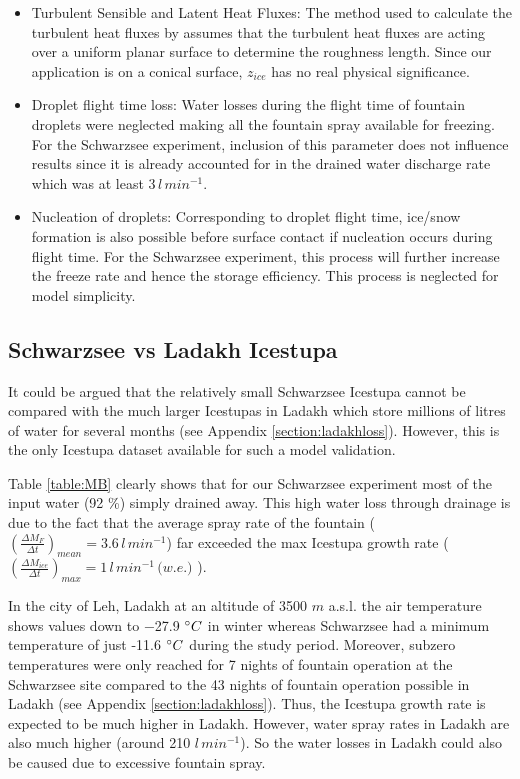 \documentclass[utf8]{frontiersSCNS} %
\begin{document}
\begin{itemize}

\item  Turbulent Sensible and Latent Heat Fluxes: The method used to calculate the turbulent heat fluxes by
  \cite{Garratt_1992} assumes that the turbulent heat fluxes are acting over a uniform planar surface to determine the
  roughness length. Since our application is on a conical surface, $z_{ice}$ has no real physical significance.

\item Droplet flight time loss: Water losses during the flight time of fountain droplets were neglected making all the
  fountain spray available for freezing. For the Schwarzsee experiment, inclusion of this parameter does not influence
  results since it is already accounted for in the drained water discharge rate which was at least $3\, l\,min^{-1}$.

\item Nucleation of droplets: Corresponding to droplet flight time, ice/snow formation is also possible before surface
  contact if nucleation occurs during flight time. For the Schwarzsee experiment, this process will further increase
  the freeze rate and hence the storage efficiency. This process is neglected for model simplicity.

\end{itemize}

\subsection{Schwarzsee vs Ladakh Icestupa}
  
It could be argued that the relatively small Schwarzsee Icestupa cannot be compared with the much larger Icestupas in
Ladakh which store millions of litres of water for several months (see Appendix \ref{section:ladakhloss}). However,
this is the only Icestupa dataset available for such a model validation.

Table \ref{table:MB} clearly shows that for our Schwarzsee experiment most of the input water (92 \%) simply drained
away. This high water loss through drainage is due to the fact that the average spray rate of the fountain
($(\frac{\Delta M_{F}}{\Delta t})_{mean} = 3.6\, l\,min^{-1}$) far exceeded the max Icestupa growth rate
($(\frac{\Delta M_{ice}}{\Delta t})_{max} = 1\, l\,min^{-1}\, \textit{(w.e.)}$ ).

In the city of Leh, Ladakh at an altitude of 3500 $m$ a.s.l. the air temperature shows values down to −27.9 $\degree
C$ in winter \citep{Chevuturi_2018} whereas Schwarzsee had a minimum temperature of just -11.6 $\degree C$ during the
study period. Moreover, subzero temperatures were only reached for 7 nights of fountain operation at the Schwarzsee
site compared to the 43 nights of fountain operation possible in Ladakh (see Appendix \ref{section:ladakhloss}). Thus,
the Icestupa growth rate is expected to be much higher in Ladakh. However, water spray rates in Ladakh are also much
higher (around 210 $l\,min^{-1}$). So the water losses in Ladakh could also be caused due to excessive fountain spray.
\end{document}
